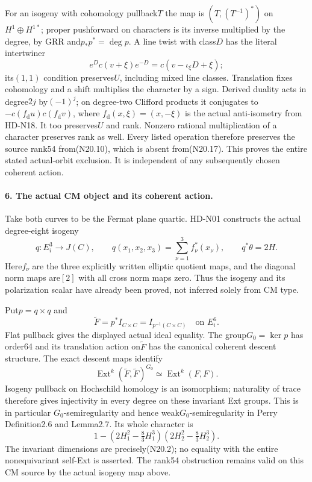 For an isogeny with cohomology pullback$T$ the map is
$(T,(T^{-1})^*)$ on$H^1\oplus H^{1*}$; proper pushforward
on characters is its inverse multiplied by the degree, by
GRR and$p_*p^*=\deg p$. A line twist with class$D$ has the
literal intertwiner
\[
 e^D c(v+\xi)e^{-D}=c(v-\iota_\xi D+\xi);
\]
its$(1,1)$ condition preserves$U$, including mixed line
classes. Translation fixes cohomology and a shift multiplies
the character by a sign. Derived duality acts in degree$2j$
by$(-1)^j$; on degree-two Clifford products it conjugates
to$-c(f_{\mathrm d}u)c(f_{\mathrm d}v)$, where
$f_{\mathrm d}(x,\xi)=(x,-\xi)$ is the actual anti-isometry
from HD-N18. It too preserves$U$ and rank. Nonzero rational
multiplication of a character preserves rank as well.
Every listed operation therefore preserves the source
rank54 from(N20.10), which is absent from(N20.17).
This proves the entire stated actual-orbit exclusion.
It is independent of any subsequently chosen coherent action.

\paragraph{6. The actual CM object and its coherent action.}
Take both curves to be the Fermat plane quartic. HD-N01 constructs
the actual degree-eight isogeny
\[
 q:E_i^3\longrightarrow J(C),\qquad
 q(x_1,x_2,x_3)=\sum_{\nu=1}^3 f_\nu^*(x_\nu),\qquad
                         q^*\theta=2H.
\]
Here$f_\nu$ are the three explicitly written elliptic quotient
maps, and the diagonal norm maps are$[2]$ with all cross
norm maps zero. Thus the isogeny and its polarization scalar
have already been proved, not inferred solely from CM type.

Put$p=q\times q$ and
\[
 \widetilde F=p^*I_{C\times C}=I_{p^{-1}(C\times C)}
                  \quad\text{on }E_i^6.                       \tag{N20.18}
\]
Flat pullback gives the displayed actual ideal equality.
The group$G_0=\ker p$ has order64 and its translation action
on$\widetilde F$ has the canonical coherent descent structure.
The exact descent maps identify
\[
 \operatorname{Ext}^k(\widetilde F,\widetilde F)^{G_0}
             \simeq\operatorname{Ext}^k(F,F).
\]
Isogeny pullback on Hochschild homology is an isomorphism;
naturality of trace therefore gives injectivity in every
degree on these invariant Ext groups. This is in particular
$G_0$-semiregularity and hence weak$G_0$-semiregularity in
Perry Definition2.6 and Lemma2.7. Its whole character is
\[
 1-\left(2H_1^2-\tfrac83H_1^3\right)
     \left(2H_2^2-\tfrac83H_2^3\right).                         \tag{N20.19}
\]
The invariant dimensions are precisely(N20.2); no equality
with the entire nonequivariant self-Ext is asserted.
The rank54 obstruction remains valid on this CM source by
the actual isogeny map above.

